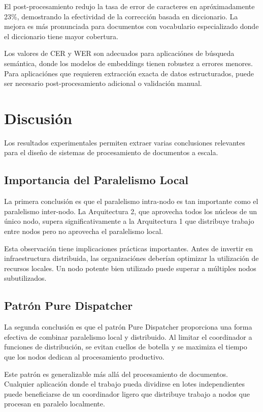 \documentclass[12pt,a4paper,twoside]{book}
\begin{document}
El post-procesamiento redujo la tasa de error de caracteres en apróximadamente 23\%, demostrando la efectividad de la corrección basada en diccionario. La mejora es más pronunciada para documentos con vocabulario especializado donde el diccionario tiene mayor cobertura.

Los valores de CER y WER son adecuados para aplicaciónes de búsqueda semántica, donde los modelos de embeddings tienen robustez a errores menores. Para aplicaciónes que requieren extracción exacta de datos estructurados, puede ser necesario post-procesamiento adicional o validación manual.

\section{Discusión}

Los resultados experimentales permiten extraer varias conclusiones relevantes para el diseño de sistemas de procesamiento de documentos a escala.

\subsection{Importancia del Paralelismo Local}

La primera conclusión es que el paralelismo intra-nodo es tan importante como el paralelismo inter-nodo. La Arquitectura 2, que aprovecha todos los núcleos de un único nodo, supera significativamente a la Arquitectura 1 que distribuye trabajo entre nodos pero no aprovecha el paralelismo local.

Esta observación tiene implicaciones prácticas importantes. Antes de invertir en infraestructura distribuida, las organizaciónes deberían optimizar la utilización de recursos locales. Un nodo potente bien utilizado puede superar a múltiples nodos subutilizados.

\subsection{Patrón Pure Dispatcher}

La segunda conclusión es que el patrón Pure Dispatcher proporciona una forma efectiva de combinar paralelismo local y distribuido. Al limitar el coordinador a funciones de distribución, se evitan cuellos de botella y se maximiza el tiempo que los nodos dedican al procesamiento productivo.

Este patrón es generalizable más allá del procesamiento de documentos. Cualquier aplicación donde el trabajo pueda dividirse en lotes independientes puede beneficiarse de un coordinador ligero que distribuye trabajo a nodos que procesan en paralelo localmente.
\end{document}
